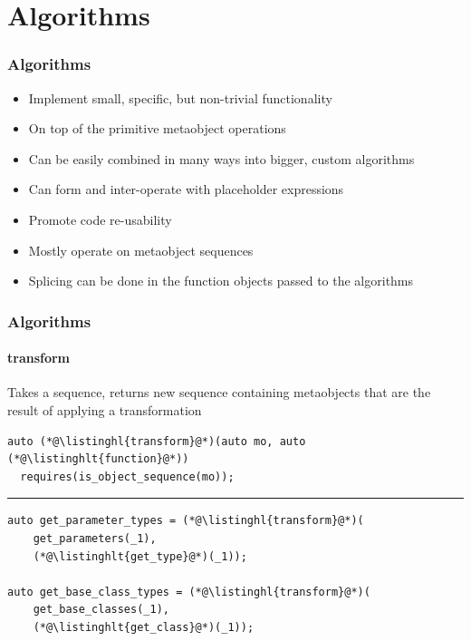 \documentclass[aspectratio=169,compress,table,xcolor=table]{beamer}
\begin{document}
\section{Algorithms}
\begin{frame}
  \frametitle{Algorithms}
  \larger
  \begin{itemize}
    \item Implement small, specific, but non-trivial functionality
    \item On top of the primitive metaobject operations
    \item Can be easily combined in many ways into bigger, custom algorithms
    \item Can form and inter-operate with placeholder expressions
    \item Promote code re-usability
    \item Mostly operate on metaobject sequences
    \item Splicing can be done in the function objects passed
      to the algorithms
  \end{itemize}
\end{frame}
\begin{frame}[fragile]
  \frametitle{Algorithms}
  \framesubtitle{transform}
  Takes a sequence, returns new sequence containing metaobjects that are
  the result of applying a transformation 
  \begin{lstlisting}[language=c++2x]
auto (*@\listinghl{transform}@*)(auto mo, auto (*@\listinghlt{function}@*))
  requires(is_object_sequence(mo));
  \end{lstlisting}
  \hrule
  \vfill
  \begin{lstlisting}[language=c++2x,basicstyle=\small\ttfamily]
auto get_parameter_types = (*@\listinghl{transform}@*)(
    get_parameters(_1),
    (*@\listinghlt{get_type}@*)(_1));

auto get_base_class_types = (*@\listinghl{transform}@*)(
    get_base_classes(_1),
    (*@\listinghlt{get_class}@*)(_1));
  \end{lstlisting}
\end{frame}
\end{document}
